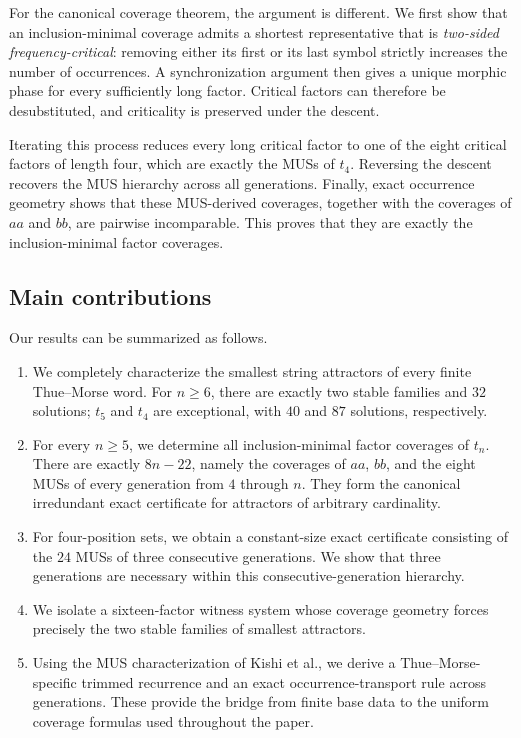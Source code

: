 \documentclass[10pt,a4paper]{article}
\theoremstyle{definition}\newtheorem{definition}[theorem]{Definition}
\theoremstyle{remark}\newtheorem{remark}[theorem]{Remark}
\begin{document}
For the canonical coverage theorem, the argument is different. We first show that an inclusion-minimal coverage admits a shortest representative that is \emph{two-sided frequency-critical}: removing either its first or its last symbol strictly increases the number of occurrences. A synchronization argument then gives a unique morphic phase for every sufficiently long factor. Critical factors can therefore be desubstituted, and criticality is preserved under the descent.

Iterating this process reduces every long critical factor to one of the eight critical factors of length four, which are exactly the MUSs of $t_4$. Reversing the descent recovers the MUS hierarchy across all generations. Finally, exact occurrence geometry shows that these MUS-derived coverages, together with the coverages of $aa$ and $bb$, are pairwise incomparable. This proves that they are exactly the inclusion-minimal factor coverages.

\subsection{Main contributions}
Our results can be summarized as follows.
\begin{enumerate}[leftmargin=*]
\item We completely characterize the smallest string attractors of every finite Thue--Morse word. For $n\geq6$, there are exactly two stable families and $32$ solutions; $t_5$ and $t_4$ are exceptional, with $40$ and $87$ solutions, respectively.
\item For every $n\geq5$, we determine all inclusion-minimal factor coverages of $t_n$. There are exactly $8n-22$, namely the coverages of $aa$, $bb$, and the eight MUSs of every generation from $4$ through $n$. They form the canonical irredundant exact certificate for attractors of arbitrary cardinality.
\item For four-position sets, we obtain a constant-size exact certificate consisting of the $24$ MUSs of three consecutive generations. We show that three generations are necessary within this consecutive-generation hierarchy.
\item We isolate a sixteen-factor witness system whose coverage geometry forces precisely the two stable families of smallest attractors.
\item Using the MUS characterization of Kishi et al., we derive a Thue--Morse-specific trimmed recurrence and an exact occurrence-transport rule across generations. These provide the bridge from finite base data to the uniform coverage formulas used throughout the paper.
\end{enumerate}
\end{document}
